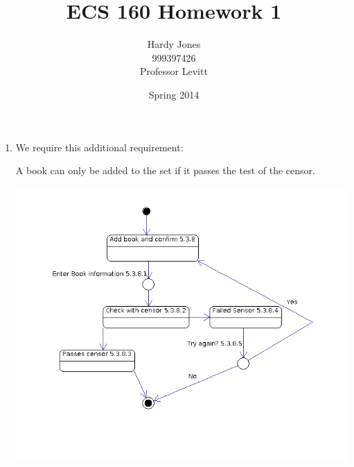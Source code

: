 \documentclass[12pt,letterpaper]{article}
\title{ECS 160 Homework 1 \vspace{-2ex}}
\author{Hardy Jones\\
        999397426\\
        Professor Levitt\vspace{-2ex}}
\date{Spring 2014}
\begin{document}
  \maketitle

  \begin{enumerate}
    \item We require this additional requirement:

      A book can only be added to the set if it passes the test of the censor.

      \includegraphics[width=\textwidth]{hw1_part1.png}
  \end{enumerate}
\end{document}
